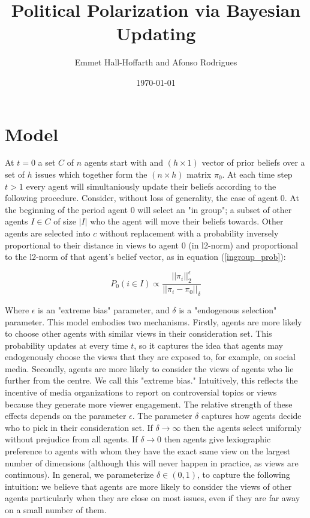 \documentclass{article}
\title{Political Polarization via Bayesian Updating}
\author{Emmet Hall-Hoffarth and Afonso Rodrigues}
\date{\today}
\begin{document}
\maketitle
    
\section{Model}

At $t=0$ a set $C$ of $n$ agents start with and $(h \times 1)$ vector of prior beliefs over a set of $h$ issues which together form the $(n \times h)$ matrix $\pi_0$. At each time step $t > 1$ every agent will simultaniously update their beliefs according to the following procedure. Consider, without loss of generality, the case of agent 0. At the beginning of the period agent 0 will select an "in group"; a subset of other agents $I \in C$ of size $|I|$ who the agent will move their beliefs towards. Other agents are selected into $c$ without replacement with a probability inversely proportional to their distance in views to agent 0 (in l2-norm) and proportional to the l2-norm of that agent's belief vector, as in equation (\ref{ingroup_prob}):

\begin{equation}
    P_0(i \in I) \propto \frac{{||\pi_i||}_2^\epsilon}{{||\pi_i - \pi_0||}_\delta}
    \label{ingroup_prob}
\end{equation}

Where $\epsilon$ is an "extreme bias" parameter, and $\delta$ is a "endogenous selection" parameter. This model embodies two mechanisms. Firstly, agents are more likely to choose other agents with similar views in their consideration set. This probability updates at every time $t$, so it captures the idea that agents may endogenously choose the views that they are exposed to, for example, on social media. Secondly, agents are more likely to consider the views of agents who lie further from the centre. We call this "extreme bias." Intuitively, this reflects the incentive of media organizations to report on controversial topics or views because they generate more viewer engagement. The relative strength of these effects depends on the parameter $\epsilon$. The parameter $\delta$ captures how agents decide who to pick in their consideration set. If $\delta \to \infty$ then the agents select uniformly without prejudice from all agents. If $\delta \to 0$ then agents give lexiographic preference to agents with whom they have the exact same view on the largest number of dimensions (although this will never happen in practice, as views are continuous). In general, we parameterize $\delta \in (0, 1)$, to capture the following intuition: we believe that agents are more likely to consider the views of other agents particularly when they are close on most issues, even if they are far away on a small number of them.  
\end{document}
